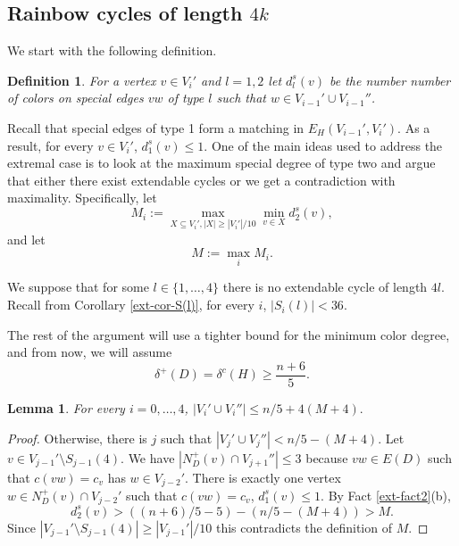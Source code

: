 \documentclass{article}
\newtheorem{defn}[theorem]{Definition}
\newtheorem{lemma}[theorem]{Lemma}
\begin{document}
 \subsection{Rainbow cycles of length $4k$}\label{ext-subsec-2}
 We start with the following definition.
 \begin{defn}
 For a vertex $v\in V_i'$ and $l=1,2$ let $d^s_l(v)$ be the number number of colors on special edges $vw$ of type $l$   {such that $w\in V_{i-1}'\cup V_{i-1}''$}. \end{defn}
 Recall that special edges of type 1 form a matching in $E_H(V_{i-1}', V_i')$. As a result, for every $v\in V_{i}'$, $d^s_1(v)\leq 1$.  One of the main ideas used to address the extremal case is to look at the maximum special degree of type two and argue that either there exist extendable cycles or we get a contradiction with maximality. Specifically, let
 \begin{equation}\label{ext-eq-Mi}
 M_i:= \max_{X\subseteq V_i', |X|\geq |V_i'|/10}\min_{v\in X}d^s_2(v),
 \end{equation}
 and let
\begin{equation}\label{ext-eq-M}M:=\max_iM_i.\end{equation}

We  suppose that for some $l\in \{1, \dots, 4\}$ there is no extendable cycle of length $4l$. Recall from Corollary \ref{ext-cor-S(l)}, for every $i$, $|S_i(l)|< {36}$. 

The rest of the argument will use a tighter bound for the minimum color degree, and from now, we will assume $$\delta^+(D)=\delta^c(H)\geq \frac{n+6}{5}.$$
\begin{lemma}\label{ext-lem-size}
 For every $i=0, \dots, 4$, $|V_i'\cup V_i''|\leq n/5+ 4(M+4).$
\end{lemma}
\begin{proof}
Otherwise, there is $j$ such that $|V_j'\cup V_j''|< n/5 - (M+4)$. Let $v\in V_{j-1}'\setminus S_{j-1}(4)$.  We have $|N^+_D(v)\cap V_{j+1}''|\leq  3$ because $vw\in E(D)$ such that $c(vw)=c_v$ has $w\in V_{j-2}'$. There is exactly one vertex $w\in N^+_D(v)\cap V_{j-2}'$ such that $c(vw)=c_v$, $d^s_1(v)\leq 1$. By Fact \ref{ext-fact2}(b), 
$$d^s_2(v)> ((n+6)/5-5) - (n/5 -(M+4))>M.$$  Since $|V_{j-1}'\setminus S_{j-1}(4)|\geq |V_{j-1}'|/10$ this  contradicts the definition of $M$.
\end{proof}
\end{document}
